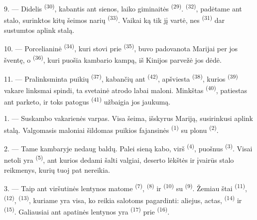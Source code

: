 9. --- Didelis  \textsuperscript{(30)}, kabantis ant sienos, laiko
giminaitės  \textsuperscript{(29)}. 
\textsuperscript{(32)}, padėtame ant stalo, surinktos kitų šeimos narių
 \textsuperscript{(33)}. Vaikai ką tik jį vartė, nes
 \textsuperscript{(31)} dar sustumtos aplink stalą.

10. --- Porcelianinė  \textsuperscript{(34)}, kuri stovi prie
 \textsuperscript{(35)}, buvo padovanota Marijai per jos
šventę, o  \textsuperscript{(36)}, kuri puošia kambario kampą, iš
Kinijos parvežė jos dėdė.

11. --- Pralinksminta puikių  \textsuperscript{(37)}, kabančių ant
 \textsuperscript{(42)}, apšviesta 
\textsuperscript{(38)}, kurios  \textsuperscript{(39)}
vakare linksmai spindi, ta svetainė atrodo labai maloni. Minkštas 
\textsuperscript{(40)}, patiestas ant parketo, ir toks patogus  \textsuperscript{(41)} užbaigia jos jaukumą.

\VUsaut{3.6mm}
\VUsaut{3.0mm}

1. --- Suskambo vakarienės varpas. Visa šeima, išskyrus Mariją, susirinkusi aplink
stalą. Valgomasis maloniai šildomas puikios fajansinės 
\textsuperscript{(1)} su plonu  \textsuperscript{(2)}.

2. --- Tame kambaryje nedaug baldų. Palei sieną kabo, virš 
\textsuperscript{(4)}, puošnus  \textsuperscript{(3)}. Visai
netoli yra  \textsuperscript{(5)}, ant kurios dedami šalti valgiai,
deserto lėkštės ir įvairūs stalo reikmenys, kurių tuoj pat nereikia.

3. --- Taip ant viršutinės lentynos matome 
\textsuperscript{(7)},  \textsuperscript{(8)} ir 
\textsuperscript{(10)} su  \textsuperscript{(9)}. Žemiau štai
 \textsuperscript{(11)},  \textsuperscript{(12)},
 \textsuperscript{(13)}, kuriame yra visa, ko reikia
salotoms pagardinti: aliejus, actas,  \textsuperscript{(14)} ir
 \textsuperscript{(15)}. Galiausiai ant apatinės lentynos yra
 \textsuperscript{(17)} prie 
\textsuperscript{(16)}.

